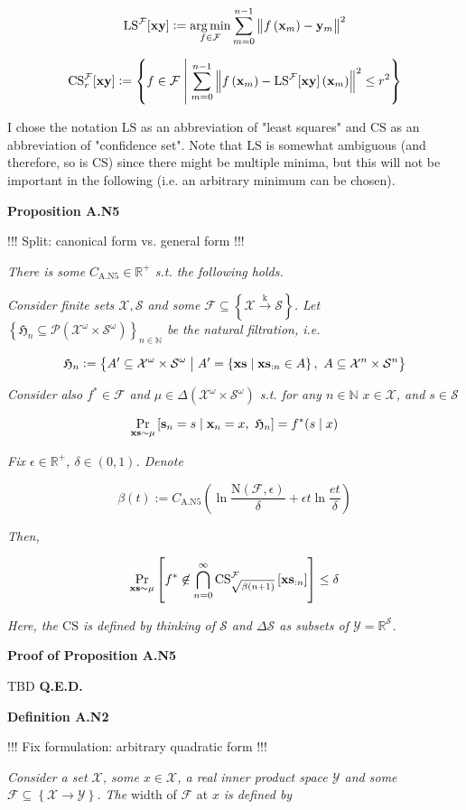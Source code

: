 \documentclass[a4paper]{article}
\newcommand{\Co}[1]{}
\newcommand{\AP}[1]{\left(#1\right)}
\newcommand{\AB}[1]{\left[#1\right]}
\newcommand{\AC}[1]{\left\{#1\right\}}
\newcommand{\ABM}[2]{\left[#1\;\middle\vert\;#2\right]}
\newcommand{\ACM}[2]{\left\{#1\;\middle\vert\;#2\right\}}
\newcommand{\Pa}[2]{\underset{#1}{\operatorname{Pr}}\AB{#2}}
\newcommand{\CP}[3]{\underset{#1}{\operatorname{Pr}}\ABM{#2}{#3}}
\newcommand{\PS}[1]{\mathcal{P}\AP{#1}}
\newcommand{\Argmin}[1]{\underset{#1}{\operatorname{arg\,min}}\,}
\newcommand{\Nats}{\mathbb{N}}
\newcommand{\Reals}{\mathbb{R}}
\newcommand{\Norm}[1]{\left\Vert #1 \right\Vert}
\newcommand{\K}{\xrightarrow{\mathrm{k}}}
\newcommand{\X}{\mathcal{X}}
\newcommand{\Y}{\mathcal{Y}}
\newcommand{\F}{\mathcal{F}}
\newcommand{\St}{\mathcal{S}}
\newcommand{\N}{\mathrm{N}}
\newcommand{\LS}{\mathrm{LS}}
\newcommand{\CS}{\mathrm{CS}}
\begin{document}
$$\LS^\F[\bold{xy}]:=\Argmin{f\in\F}{\sum_{m=0}^{n-1}\Norm{f\AP{\bold{x}_m}-\bold{y}_m}^2}$$

$$\CS^\F_{r}[\bold{xy}]:=\ACM{f\in\F}{\sum_{m=0}^{n-1}\Norm{f\AP{\bold{x}_m}-\LS^\F[\bold{xy}]\AP{\bold{x}_m}}^2\leq r^2}$$

I chose the notation $\LS$ as an abbreviation of "least squares" and $\CS$ as an abbreviation of "confidence set". Note that $\LS$ is somewhat ambiguous (and therefore, so is $\CS$) since there might be multiple minima, but this will not be important in the following (i.e. an arbitrary minimum can be chosen).

\textbf{Proposition A.N5}\Co{b}

!!! Split: canonical form vs. general form !!!

\textit{There is some $C_{\mathrm{A.N5}}\in\Reals^+$ s.t. the following holds.}\Co{i}

\textit{Consider finite sets $\X,\St$ and some $\F\subseteq\AC{\X\K\St}$. Let $\AC{\mathfrak{H}_n\subseteq\PS{\X^\omega\times\St^\omega}}_{n\in\Nats}$ be the natural filtration, i.e.}\Co{i}

$$\mathfrak{H}_n:=\ACM{A'\subseteq\X^\omega\times\St^\omega}{A'=\ACM{\bold{xs}}{\bold{xs}_{:n}\in A},\ A\subseteq\X^n\times\St^n}$$

\textit{Consider also $f^*\in\F$ and $\mu\in\Delta\AP{\X^\omega\times\St^\omega}$ s.t. for any $n\in\Nats$ $x\in\X$, and $s\in\St$}\Co{i}

$$\CP{\bold{xs}\sim\mu}{\bold{s}_n=s}{\bold{x}_n=x,\ \mathfrak{H}_n} = f^*(s\mid x)$$

\textit{Fix $\epsilon\in\Reals^+$, $\delta\in(0,1)$. Denote}\Co{i}

$$\beta(t):=C_{\mathrm{A.N5}}\AP{\ln{\frac{\N(\F,\epsilon)}{\delta}}+\epsilon t\ln{\frac{et}{\delta}}}$$

\textit{Then,}\Co{i}

$$\Pa{\bold{xs}\sim\mu}{f^*\not\in\bigcap_{n=0}^\infty\CS^\F_{\sqrt{\beta(n+1)}}\AB{\bold{xs}_{:n}}} \leq \delta$$

\textit{Here, the $\CS$ is defined by thinking of $\St$ and $\Delta\St$ as subsets of $\Y=\Reals^\St$.}\Co{i}

\textbf{Proof of Proposition A.N5}\Co{b}

TBD \textbf{Q.E.D.}\Co{b}

\textbf{Definition A.N2}\Co{b}

!!! Fix formulation: arbitrary quadratic form !!!

\textit{Consider a set $\X$, some $x\in\X$, a real inner product space $\Y$ and some $\F\subseteq\AC{\X\rightarrow\Y}$. The}\Co{i} width of $\F$ at $x$ \textit{is defined by}\Co{i}
\end{document}
